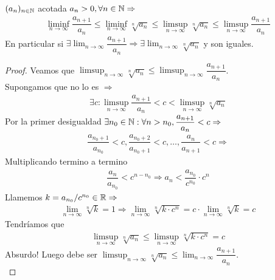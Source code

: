 \begin{theorem}
  \((a_n)_{n \in \mathbb{N}} \) acotada \(a_n > 0, \forall n \in \mathbb{N} \Rightarrow \) \begin{align*}
    \liminf_{n \to \infty} \dfrac{a_{n+1}}{a_n} \leq \liminf_{n \to \infty} \sqrt[n]{a_n} \leq \limsup_{n \to \infty} \sqrt[n]{a_n} \leq \limsup_{n \to \infty} \dfrac{a_{n+1}}{a_n}
  \end{align*}
  En particular si \(\exists \lim_{n \to \infty} \dfrac{a_{n+1}}{a_n} \Rightarrow \exists \lim_{n \to \infty} \sqrt[n]{a_n} \) y son iguales.

  \begin{proof}
    Veamos que \(\limsup_{n \to \infty} \sqrt[n]{a_n} \leq \limsup_{n \to \infty} \dfrac{a_{n+1}}{a_n} \). \\
    Supongamos que no lo es \(\Rightarrow \)
    \begin{align*}
      \exists c : \limsup_{n \to \infty} \dfrac{a_{n+1}}{a_n} < c < \limsup_{n \to \infty} \sqrt[n]{a_n}
    \end{align*} Por la primer desigualdad \(\exists n_0 \in \mathbb{N} : \forall n > n_0, \dfrac{a_{n+1}}{a_n} < c \Rightarrow \) \begin{align*}
      \dfrac{a_{n_0+1}}{a_{n_0}} < c, \dfrac{a_{n_0+2}}{a_{n_0+1}} < c, \ldots, \dfrac{a_n}{a_{n+1}} < c \Rightarrow
    \end{align*}
    Multiplicando termino a termino
    \begin{align*}
      \dfrac{a_n}{a_{n_0}} < c^{n - n_0} \Rightarrow a_n < \dfrac{a_{n_0}}{c^{n_0}} \cdot c^n
    \end{align*} Llamemos \(k = a_{n_0}/c^{n_0} \in \mathbb{R} \Rightarrow \) \begin{align*}
      \lim_{n \to \infty} \sqrt[n]{k} = 1 \Rightarrow \lim_{n \to \infty} \sqrt[n]{k \cdot c^n} = c \cdot \lim_{n \to \infty} \sqrt[n]{k} = c
    \end{align*} Tendríamos que \begin{align*}
      \limsup_{n \to \infty} \sqrt[n]{a_n} \leq \limsup_{n \to \infty} \sqrt[n]{k \cdot c^n} = c
    \end{align*} Absurdo!
    Luego debe ser \(\limsup_{n \to \infty} \sqrt[n]{a_n} \leq \lim_{n \to \infty} \dfrac{a_{n+1}}{a_n} \). \\
  \end{proof}
\end{theorem}

\clearpage

